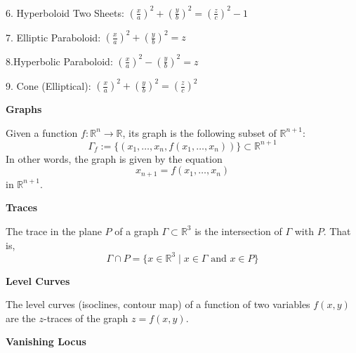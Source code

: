 \documentclass{article}
\begin{document}


6. Hyperboloid Two Sheets: \(
\left( \frac{x}{a} \right)^2 + \left( \frac{y}{b} \right)^2 = \left( \frac{z}{c} \right)^2 - 1
\)



7. Elliptic Paraboloid: \(
\left( \frac{x}{a} \right)^2 + \left( \frac{y}{b} \right)^2 = z
\)



8.Hyperbolic Paraboloid:  \(
\left( \frac{x}{a} \right)^2 - \left( \frac{y}{b} \right)^2 = z
\)



9. Cone (Elliptical): \(
\left( \frac{x}{a} \right)^2 + \left( \frac{y}{b} \right)^2 = \left( \frac{z}{c} \right)^2
\)



\vspace{1cm}

\noindent \textbf{Graphs}

Given a function \( f : \mathbb{R}^n \rightarrow \mathbb{R} \), its graph is the following subset of \( \mathbb{R}^{n+1} \):
\[ \Gamma_f := \{ (x_1, \dots, x_n, f(x_1, \dots, x_n)) \} \subset \mathbb{R}^{n+1} \]
In other words, the graph is given by the equation
\[ x_{n+1} = f(x_1, \dots, x_n) \] in \( \mathbb{R}^{n+1} \).

\vspace{0.5cm}


\noindent \textbf{Traces}

The trace in the plane \( P \) of a graph \( \Gamma \subset \mathbb{R}^3 \) is the intersection of \( \Gamma \)
with \( P \). That is,
\[ \Gamma \cap P = \{ x \in \mathbb{R}^3 \mid x \in \Gamma \text{ and } x \in P \} \]


\vspace{0.5cm}

\noindent \textbf{Level Curves}

The level curves (isoclines, contour map) of a function of two variables \( f(x, y) \) are the \( z \)-traces of the graph \( z = f(x, y) \).


\vspace{0.5cm}

\noindent \textbf{Vanishing Locus}
\end{document}
